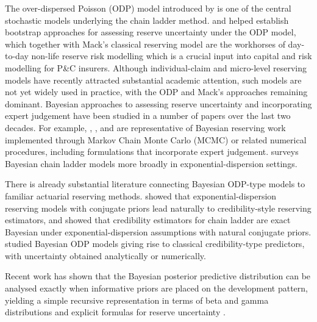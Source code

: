 \documentclass[11pt]{article}
\newcommand{\1}{\mathbf{1}}
\begin{document}
The over-dispersed Poisson (ODP) model introduced by \citet{RenshawVerrall1998} is one of the central stochastic models underlying the chain ladder method. \citet{EnglandVerrall2002} and \citet{EnglandVerrall2006} helped establish bootstrap approaches for assessing
reserve uncertainty under the ODP model, which together with Mack's classical reserving model \citep{Mack1993} are the workhorses of day-to-day non-life reserve risk modelling which is a crucial input into capital and risk modelling for P\&C insurers.
Although individual-claim and micro-level reserving models have recently attracted substantial academic attention, such models are not yet widely used in practice, with the ODP and Mack's approaches remaining dominant.
Bayesian approaches to assessing reserve uncertainty and incorporating expert judgement have been studied in a number of papers over the last two decades. For example, \citet{NtzoufrasDellaportas2002}, 
\citet{Verrall2004BF}, \citet{VerrallEngland2005} and \citet{Verrall2007ExpertOpinion} are representative of Bayesian reserving work implemented through Markov Chain Monte Carlo (MCMC) or related numerical procedures, 
including formulations that incorporate expert judgement. \citet{Taylor2015BayesianCL} surveys Bayesian chain ladder models more broadly in exponential-dispersion settings.

There is already substantial literature connecting Bayesian ODP-type models to familiar actuarial reserving methods. \citet{Wuthrich2007} showed that exponential-dispersion reserving models with conjugate priors lead naturally to credibility-style reserving estimators, and \citet{GislerWuthrich2008} showed that credibility estimators for chain ladder are exact Bayesian under exponential-dispersion assumptions with natural conjugate priors. 
\citet{EnglandVerrallWuthrich2012} studied Bayesian ODP models giving rise to classical credibility-type predictors, with uncertainty obtained analytically or numerically. 

Recent work has shown that the Bayesian posterior predictive distribution can be analysed exactly when informative priors are placed on the development pattern, yielding a simple recursive representation in terms of beta and gamma distributions and explicit formulas for reserve uncertainty \citep{Norman2025ODP}.
\end{document}
